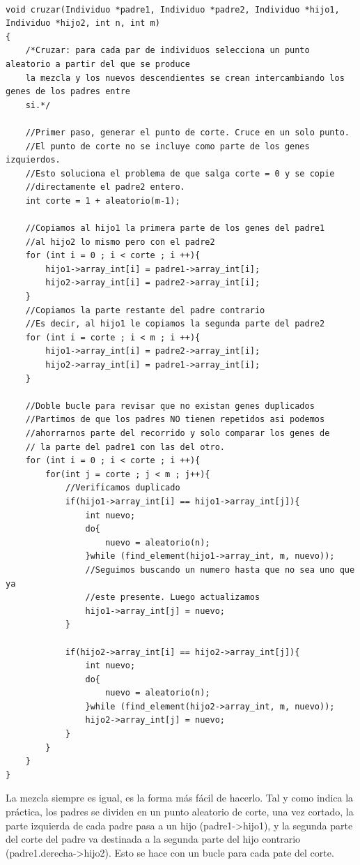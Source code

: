 \documentclass[12pt]{article}
\begin{document}
\begin{enumerate}
\begin{lstlisting}[style=EstiloC]

void cruzar(Individuo *padre1, Individuo *padre2, Individuo *hijo1, Individuo *hijo2, int n, int m)
{	
	/*Cruzar: para cada par de individuos selecciona un punto aleatorio a partir del que se produce
	la mezcla y los nuevos descendientes se crean intercambiando los genes de los padres entre
	si.*/
	
	//Primer paso, generar el punto de corte. Cruce en un solo punto.
	//El punto de corte no se incluye como parte de los genes izquierdos.
	//Esto soluciona el problema de que salga corte = 0 y se copie 
	//directamente el padre2 entero.
	int corte = 1 + aleatorio(m-1); 

	//Copiamos al hijo1 la primera parte de los genes del padre1
	//al hijo2 lo mismo pero con el padre2
	for (int i = 0 ; i < corte ; i ++){
		hijo1->array_int[i] = padre1->array_int[i];
		hijo2->array_int[i] = padre2->array_int[i];
	}
	//Copiamos la parte restante del padre contrario
	//Es decir, al hijo1 le copiamos la segunda parte del padre2
	for (int i = corte ; i < m ; i ++){
		hijo1->array_int[i] = padre2->array_int[i];
		hijo2->array_int[i] = padre1->array_int[i];
	}
	
	//Doble bucle para revisar que no existan genes duplicados 
	//Partimos de que los padres NO tienen repetidos asi podemos 
	//ahorrarnos parte del recorrido y solo comparar los genes de 
	// la parte del padre1 con las del otro.
	for (int i = 0 ; i < corte ; i ++){
		for(int j = corte ; j < m ; j++){
			//Verificamos duplicado
			if(hijo1->array_int[i] == hijo1->array_int[j]){
				int nuevo;
				do{
					nuevo = aleatorio(n);
				}while (find_element(hijo1->array_int, m, nuevo));
				//Seguimos buscando un numero hasta que no sea uno que ya 
				//este presente. Luego actualizamos
				hijo1->array_int[j] = nuevo;
			}
			
			if(hijo2->array_int[i] == hijo2->array_int[j]){
				int nuevo;
				do{
					nuevo = aleatorio(n);
				}while (find_element(hijo2->array_int, m, nuevo));
				hijo2->array_int[j] = nuevo;
			}
		}
	}
}
\end{lstlisting}
La mezcla siempre es igual, es la forma más fácil de hacerlo. Tal y como indica la práctica, los padres se dividen en un punto aleatorio de corte, 
una vez cortado, la parte izquierda de cada padre pasa a un hijo (padre1->hijo1), y la segunda parte del corte del padre va destinada a la segunda parte del 
hijo contrario (padre1.derecha->hijo2). Esto se hace con un bucle para cada pate del corte.


\end{enumerate}
\end{document}
